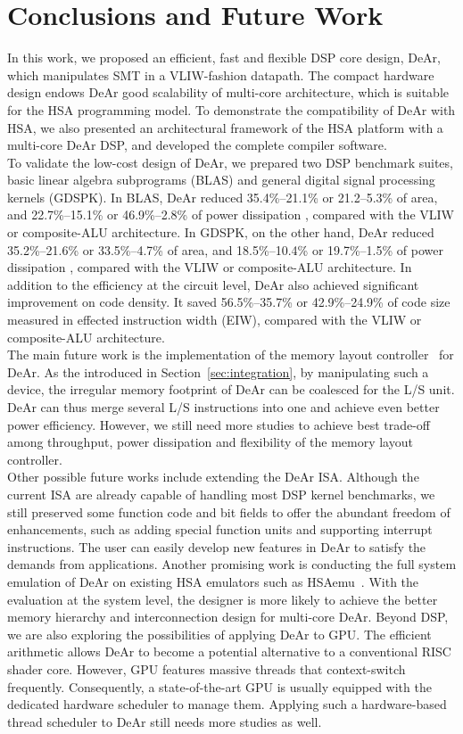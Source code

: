 \chapter{Conclusions and Future Work}
In this work, we proposed an efficient, fast and flexible DSP core design, DeAr,
which manipulates SMT in a VLIW-fashion datapath.
The compact hardware design endows DeAr good scalability of multi-core architecture, 
which is suitable for the HSA programming model.
To demonstrate the compatibility of DeAr with HSA,
we also presented an architectural framework of the HSA platform with a multi-core DeAr DSP, 
and developed the complete compiler software.
\\\indent
To validate the low-cost design of DeAr, we prepared two DSP benchmark suites, basic linear algebra subprograms (BLAS) and general digital signal processing kernels (GDSPK).
In BLAS, DeAr reduced 35.4\%--21.1\% or 21.2--5.3\% of area,
and 22.7\%--15.1\% or 46.9\%--2.8\% of power dissipation , compared with the VLIW or composite-ALU architecture.
In GDSPK, on the other hand, DeAr reduced 35.2\%--21.6\% or 33.5\%--4.7\% of area, 
and 18.5\%--10.4\% or 19.7\%--1.5\% of power dissipation , compared with the VLIW or composite-ALU architecture.
In addition to the efficiency at the circuit level, DeAr also achieved significant improvement on code density.
It saved 56.5\%--35.7\% or 42.9\%--24.9\% of code size measured in effected instruction width (EIW), 
compared with the VLIW or composite-ALU architecture.
\\\indent
The main future work is the implementation of the memory layout controller~\cite{sc} for DeAr.
As the introduced in Section~\ref{sec:integration}, by manipulating such a device, the irregular memory footprint of DeAr can be coalesced for the L/S unit.
DeAr can thus merge several L/S instructions into one and achieve even better power efficiency.
However, we still need more studies to achieve best trade-off among throughput, power dissipation and flexibility of the memory layout controller.
\\\indent
Other possible future works include extending the DeAr ISA.
Although the current ISA are already capable of handling most DSP kernel benchmarks, 
we still preserved some function code and bit fields to offer the abundant freedom of enhancements, 
such as adding special function units and supporting interrupt instructions.
The user can easily develop new features in DeAr to satisfy the demands from applications.
Another promising work is conducting the full system emulation of DeAr on existing HSA emulators such as HSAemu~\cite{hsaemu}.
With the evaluation at the system level, the designer is more likely to achieve the better memory hierarchy and interconnection design for multi-core DeAr.
Beyond DSP, we are also exploring the possibilities of applying DeAr to GPU.
The efficient arithmetic allows DeAr to become a potential alternative to a conventional RISC shader core.
However, GPU features massive threads that context-switch frequently.
Consequently, a state-of-the-art GPU is usually equipped with the dedicated hardware scheduler to manage them.
Applying such a hardware-based thread scheduler to DeAr still needs more studies as well.


